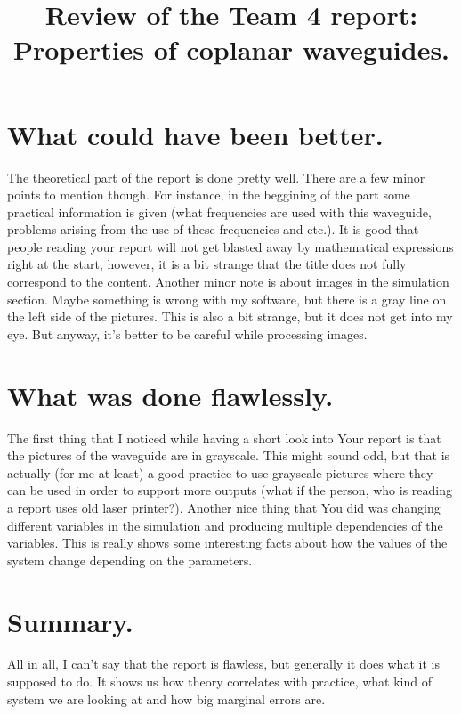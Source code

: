 \documentclass[a4paper, titlepage, 10pt]{article}
\begin{document}
\title{Review of the Team 4 report: \\ Properties of coplanar waveguides.}
\section{What could have been better.}
The theoretical part of the report is done pretty well. There are a few minor points to mention though. For instance, in the beggining of the part some practical information is given (what frequencies are used with this waveguide, problems arising from the use of these frequencies and etc.). It is good that people reading your report will not get blasted away by mathematical expressions right at the start, however, it is a bit strange that the title does not fully correspond to the content. Another minor note is about images in the simulation section. Maybe something is wrong with my software, but there is a gray line on the left side of the pictures. This is also a bit strange, but it does not get into my eye. But anyway, it's better to be careful while processing images.
\section{What was done flawlessly.}
The first thing that I noticed while having a short look into Your report is that the pictures of the waveguide are in grayscale. This might sound odd, but that is actually (for me at least) a good practice to use grayscale pictures where they can be used in order to support more outputs (what if the person, who is reading a report uses old laser printer?). Another nice thing that You did was changing different variables in the simulation and producing multiple dependencies of the variables. This is really shows some interesting facts about how the values of the system change depending on the parameters.
\section{Summary.}
All in all, I can't say that the report is flawless, but generally it does what it is supposed to do. It shows us how theory correlates with practice, what kind of system we are looking at and how big marginal errors are.
\end{document}
